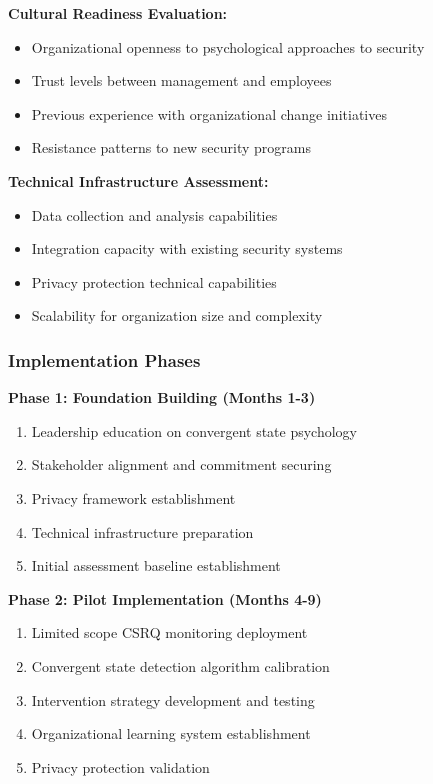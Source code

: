 \documentclass[11pt,a4paper]{article}
\begin{document}
\textbf{Cultural Readiness Evaluation:}
\begin{itemize}
\item Organizational openness to psychological approaches to security
\item Trust levels between management and employees
\item Previous experience with organizational change initiatives
\item Resistance patterns to new security programs
\end{itemize}

\textbf{Technical Infrastructure Assessment:}
\begin{itemize}
\item Data collection and analysis capabilities
\item Integration capacity with existing security systems
\item Privacy protection technical capabilities
\item Scalability for organization size and complexity
\end{itemize}

\subsubsection{Implementation Phases}

\textbf{Phase 1: Foundation Building (Months 1-3)}
\begin{enumerate}
\item Leadership education on convergent state psychology
\item Stakeholder alignment and commitment securing
\item Privacy framework establishment
\item Technical infrastructure preparation
\item Initial assessment baseline establishment
\end{enumerate}

\textbf{Phase 2: Pilot Implementation (Months 4-9)}
\begin{enumerate}
\item Limited scope CSRQ monitoring deployment
\item Convergent state detection algorithm calibration
\item Intervention strategy development and testing
\item Organizational learning system establishment
\item Privacy protection validation
\end{enumerate}
\end{document}
